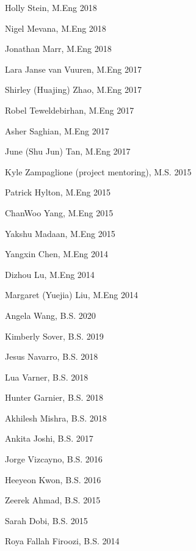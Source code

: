\documentclass[letterpaper]{deedy-resume} %
\begin{document}
\begin{minipage}[t]{0.5\textwidth}

{}

\begin{tightitemize}

\item Holly Stein, M.Eng 2018
\item Nigel Mevana, M.Eng 2018
\item Jonathan Marr, M.Eng 2018
\item Lara Janse van Vuuren, M.Eng 2017
\item Shirley (Huajing) Zhao, M.Eng 2017
\item Robel Teweldebirhan, M.Eng 2017
\item Asher Saghian, M.Eng 2017
\item June (Shu Jun) Tan, M.Eng 2017
\item Kyle Zampaglione (project mentoring), M.S. 2015
\item Patrick Hylton, M.Eng 2015
\item ChanWoo Yang, M.Eng 2015
\item Yakshu Madaan, M.Eng 2015
\item Yangxin Chen, M.Eng 2014
\item Dizhou Lu, M.Eng 2014
\item Margaret (Yuejia) Liu, M.Eng 2014

\end{tightitemize}

\end{minipage}%
\begin{minipage}[t]{0.5\textwidth}

  \vspace{0.05cm}
  
{}

\begin{tightitemize}

\item Angela Wang, B.S. 2020
\item Kimberly Sover, B.S. 2019
\item Jesus Navarro, B.S. 2018
\item Lua Varner,  B.S. 2018
\item Hunter Garnier, B.S. 2018
\item Akhilesh Mishra, B.S. 2018
\item Ankita Joshi, B.S. 2017
\item Jorge Vizcayno, B.S. 2016
\item Heeyeon Kwon, B.S. 2016
\item Zeerek Ahmad, B.S. 2015
\item Sarah Dobi, B.S. 2015
\item Roya Fallah Firoozi, B.S. 2014


\end{tightitemize}

\end{minipage}
\end{document}
